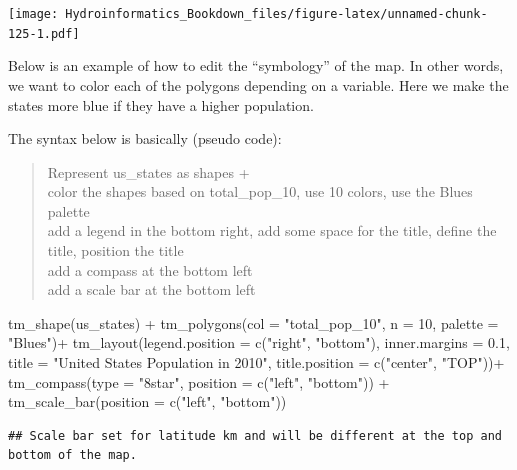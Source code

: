\documentclass[
]{book}
\newenvironment{Shaded}{\begin{snugshade}}{\end{snugshade}}
\newcommand{\AttributeTok}[1]{\textcolor[rgb]{0.77,0.63,0.00}{#1}}
\newcommand{\DecValTok}[1]{\textcolor[rgb]{0.00,0.00,0.81}{#1}}
\newcommand{\FloatTok}[1]{\textcolor[rgb]{0.00,0.00,0.81}{#1}}
\newcommand{\FunctionTok}[1]{\textcolor[rgb]{0.00,0.00,0.00}{#1}}
\newcommand{\NormalTok}[1]{#1}
\newcommand{\SpecialCharTok}[1]{\textcolor[rgb]{0.00,0.00,0.00}{#1}}
\newcommand{\StringTok}[1]{\textcolor[rgb]{0.31,0.60,0.02}{#1}}
\begin{document}
\texttt{[image: Hydroinformatics\_Bookdown\_files/figure-latex/unnamed-chunk-125-1.pdf]}

Below is an example of how to edit the ``symbology'' of the map. In other words, we want to color each of the polygons depending on a variable. Here we make the states more blue if they have a higher population.

The syntax below is basically (pseudo code):

\begin{quote}
Represent us\_states as shapes +\\
color the shapes based on total\_pop\_10, use 10 colors, use the Blues palette\\
add a legend in the bottom right, add some space for the title, define the title, position the title\\
add a compass at the bottom left\\
add a scale bar at the bottom left\\
\end{quote}

\begin{Shaded}
\begin{Highlighting}[]
\FunctionTok{tm\_shape}\NormalTok{(us\_states) }\SpecialCharTok{+} 
  \FunctionTok{tm\_polygons}\NormalTok{(}\AttributeTok{col =} \StringTok{"total\_pop\_10"}\NormalTok{, }\AttributeTok{n =} \DecValTok{10}\NormalTok{, }\AttributeTok{palette =} \StringTok{"Blues"}\NormalTok{)}\SpecialCharTok{+}
  \FunctionTok{tm\_layout}\NormalTok{(}\AttributeTok{legend.position =} \FunctionTok{c}\NormalTok{(}\StringTok{"right"}\NormalTok{, }\StringTok{"bottom"}\NormalTok{), }
            \AttributeTok{inner.margins =} \FloatTok{0.1}\NormalTok{,}
            \AttributeTok{title =} \StringTok{"United States Population in 2010"}\NormalTok{, }
            \AttributeTok{title.position =} \FunctionTok{c}\NormalTok{(}\StringTok{"center"}\NormalTok{, }\StringTok{"TOP"}\NormalTok{))}\SpecialCharTok{+}
  \FunctionTok{tm\_compass}\NormalTok{(}\AttributeTok{type =} \StringTok{"8star"}\NormalTok{, }\AttributeTok{position =} \FunctionTok{c}\NormalTok{(}\StringTok{"left"}\NormalTok{, }\StringTok{"bottom"}\NormalTok{)) }\SpecialCharTok{+}
  \FunctionTok{tm\_scale\_bar}\NormalTok{(}\AttributeTok{position =} \FunctionTok{c}\NormalTok{(}\StringTok{"left"}\NormalTok{, }\StringTok{"bottom"}\NormalTok{))}
\end{Highlighting}
\end{Shaded}

\begin{verbatim}
## Scale bar set for latitude km and will be different at the top and bottom of the map.
\end{verbatim}
\end{document}
